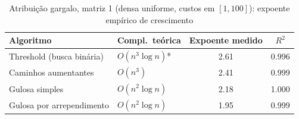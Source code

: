 \begin{table}[H]
    \centering
    \caption{Atribuição gargalo, matriz 1 (densa uniforme, custos em $[1, 100]$): expoente empírico de crescimento}
    \label{tab:exp-bottleneck}
    \renewcommand{\arraystretch}{1.25}
    \footnotesize
    \begin{tabularx}{\textwidth}{@{} X l c c @{}}
        \toprule
        \textbf{Algoritmo} & \textbf{Compl.\ teórica} & \textbf{Expoente medido} & \textbf{$R^2$} \\
        \midrule
        Threshold (busca binária) & $O(n^{3} \log n)$* & 2.61 & 0.996 \\
        Caminhos aumentantes & $O(n^{3})$ & 2.41 & 0.999 \\
        Gulosa simples & $O(n^{2} \log n)$ & 2.18 & 1.000 \\
        Gulosa por arrependimento & $O(n^{2} \log n)$ & 1.95 & 0.999 \\
        \bottomrule
    \end{tabularx}
\end{table}
